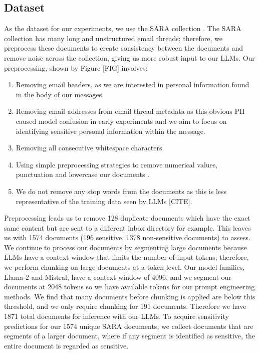 \subsection{Dataset}
As the dataset for our experiments, we use the SARA collection \cite{mckechnie2024sara}. The SARA collection has many long and unstructured email threads; therefore, we preprocess these documents to create consistency between the documents and remove noise across the collection, giving us more robust input to our LLMs. Our preprocessing, shown by Figure [FIG] involves:
\begin{enumerate}
    \item Removing email headers, as we are interested in personal information found in the body of our messages.
    \item Removing email addresses from email thread metadata as this obvious PII caused model confusion in early experiments and we aim to focus on identifying sensitive personal information within the message.
    \item Removing all consecutive whitespace characters.
    \item Using simple preprocessing strategies to remove numerical values, punctuation and lowercase our documents \cite{rehurek2011gensim}.
    \item We do not remove any stop words from the documents as this is less representative of the training data seen by LLMs [CITE].
\end{enumerate}

Preprocessing leads us to remove 128 duplicate documents which have the exact same content but are sent to a different inbox directory for example. This leaves us with 1574 documents (196 sensitive, 1378 non-sensitive documents) to assess. We continue to process our documents by segmenting large documents because LLMs have a context window that limits the number of input tokens; therefore, we perform chunking on large documents at a token-level. Our model families, Llama-2 and Mistral, have a context window of 4096, and we segment our documents at 2048 tokens so we have available tokens for our prompt engineering methods. We find that many documents before chunking is applied are below this threshold, and we only require chunking for 191 documents. Therefore we have 1871 total documents for inference with our LLMs. To acquire sensitivity predictions for our 1574 unique SARA documents, we collect documents that are segments of a larger document, where if any segment is identified as sensitive, the entire document is regarded as sensitive.

